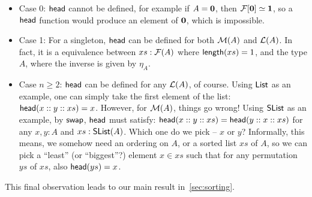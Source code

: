 \begin{itemize}
    \item
          Case 0: $\operatorname{\mathsf{head}}$ cannot be defined, for example if $A = {\mathbf{0}}$, then $\mathcal{F}[{\mathbf{0}}] \mathrel{\simeq} {\mathbf{1}}$,
          so a $\operatorname{\mathsf{head}}$ function would produce an element of ${\mathbf{0}}$, which is impossible.

    \item
          Case 1: For a singleton, $\operatorname{\mathsf{head}}$ can be defined for both $\mathcal{M}(A)$ and $\mathcal{L}(A)$.
          In fact, it is a equivalence between $xs : \mathcal{F}(A)$ where $\operatorname{\mathsf{length}}(xs) = 1$, and the type $A$,
          where the inverse is given by $\eta_A$.

    \item
          Case $n \geq 2$: $\operatorname{\mathsf{head}}$ can be defined for any $\mathcal{L}(A)$, of course.
          Using $\operatorname{\mathsf{List}}$ as an example, one can simply take the first element of the list:
          $\operatorname{\mathsf{head}}(x :: y :: xs) = x$.
          However, for $\mathcal{M}(A)$, things go wrong!
          Using $\operatorname{\mathsf{SList}}$ as an example, by $\operatorname{\mathsf{swap}}$, $\operatorname{\mathsf{head}}$ must satisfy:
          $\operatorname{\mathsf{head}}(x :: y :: xs) = \operatorname{\mathsf{head}}(y :: x :: xs)$ for any $x, y : A$ and $xs : \operatorname{\mathsf{SList}}(A)$.
          Which one do we pick -- $x$ or $y$?
          Informally, this means, we somehow need an ordering on $A$, or a sorted list $xs$ of $A$,
          so we can pick a ``least'' (or ``biggest''?) element $x \in xs$ such that for any permutation $ys$ of $xs$,
          also $\operatorname{\mathsf{head}}(ys) = x$.
\end{itemize}

This final observation leads to our main result in~\cref{sec:sorting}.
